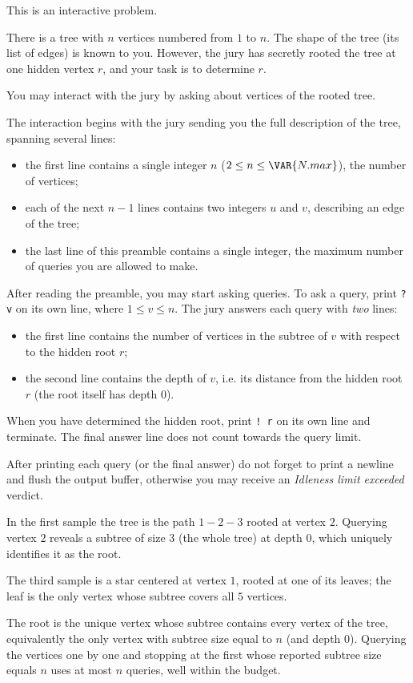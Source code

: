 This is an interactive problem.

There is a tree with $n$ vertices numbered from $1$ to $n$. The shape of the
tree (its list of edges) is known to you. However, the jury has secretly rooted
the tree at one hidden vertex $r$, and your task is to determine $r$.

You may interact with the jury by asking about vertices of the rooted tree.

The interaction begins with the jury sending you the full description of the
tree, spanning several lines:

\begin{itemize}
	\item the first line contains a single integer $n$
	      ($2 \le n \le \VAR{N.max}$), the number of vertices;
	\item each of the next $n - 1$ lines contains two integers $u$ and $v$,
	      describing an edge of the tree;
	\item the last line of this preamble contains a single integer, the
	      maximum number of queries you are allowed to make.
\end{itemize}

After reading the preamble, you may start asking queries. To ask a query,
print \texttt{? v} on its own line, where $1 \le v \le n$. The jury answers
each query with \emph{two} lines:

\begin{itemize}
	\item the first line contains the number of vertices in the subtree of
	      $v$ with respect to the hidden root $r$;
	\item the second line contains the depth of $v$, i.e. its distance from
	      the hidden root $r$ (the root itself has depth $0$).
\end{itemize}

When you have determined the hidden root, print \texttt{! r} on its own line
and terminate. The final answer line does not count towards the query limit.

After printing each query (or the final answer) do not forget to print a
newline and flush the output buffer, otherwise you may receive an
\textit{Idleness limit exceeded} verdict.

In the first sample the tree is the path $1 - 2 - 3$ rooted at vertex $2$.
Querying vertex $2$ reveals a subtree of size $3$ (the whole tree) at depth
$0$, which uniquely identifies it as the root.

The third sample is a star centered at vertex $1$, rooted at one of its
leaves; the leaf is the only vertex whose subtree covers all $5$ vertices.

The root is the unique vertex whose subtree contains every vertex of the tree,
equivalently the only vertex with subtree size equal to $n$ (and depth $0$).
Querying the vertices one by one and stopping at the first whose reported
subtree size equals $n$ uses at most $n$ queries, well within the budget.

